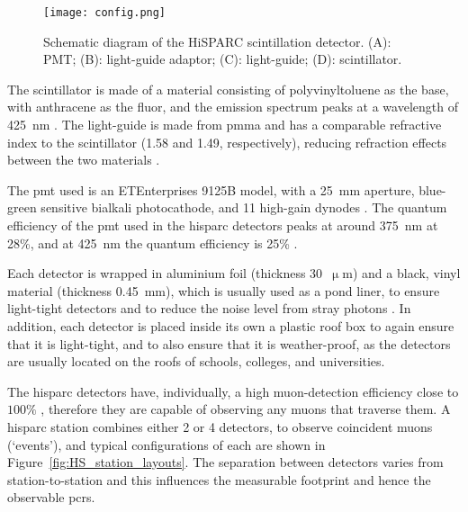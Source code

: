 \begin{figure}[ht!]
	\centering
	\texttt{[image: config.png]}
	\caption{Schematic diagram of the HiSPARC scintillation detector. (A): PMT; (B): light-guide adaptor; (C): light-guide; (D): scintillator.}
	\label{fig:HS_scintillator}
\end{figure}

The scintillator is made of a material consisting of polyvinyltoluene as the base, with anthracene as the fluor, and the emission spectrum peaks at a wavelength of 425~nm \citep{fokkema_hisparc_2012, bartels_hisparc_2012}. The light-guide is made from \gls{pmma} and has a comparable refractive index to the scintillator (1.58 and 1.49, respectively), reducing refraction effects between the two materials \citep{van_dam_hisparc_2020}.

The \gls{pmt} used is an ETEnterprises 9125B model, with a 25~mm aperture,  blue-green sensitive bialkali photocathode, and 11 high-gain dynodes \citep{bartels_hisparc_2012,et_enterprises_data_2020}. The quantum efficiency of the \gls{pmt} used in the \gls{hisparc} detectors peaks at around 375~nm at 28\%, and at 425~nm the quantum efficiency is 25\% \citep{fokkema_hisparc_2012}. 

Each detector is wrapped in aluminium foil (thickness 30~$\upmu$m) and a black, vinyl material (thickness 0.45~mm), which is usually used as a pond liner, to ensure light-tight detectors and to reduce the noise level from stray photons \citep{van_dam_hisparc_2020}. In addition, each detector is placed inside its own a plastic roof box to again ensure that it is light-tight, and to also ensure that it is weather-proof, as the detectors are usually located on the roofs of schools, colleges, and universities.

The \gls{hisparc} detectors have, individually, a high muon-detection
efficiency close to $100\%$ \citep{fokkema_hisparc_2012, van_dam_hisparc_2020}, therefore they are capable of observing any muons that traverse them. A \gls{hisparc} station combines either 2 or 4 detectors, to observe coincident muons (`events'), and typical configurations of each are shown in Figure~\ref{fig:HS_station_layouts}. The separation between detectors varies from station-to-station and this influences the measurable footprint and hence the observable \glspl{pcr}.


